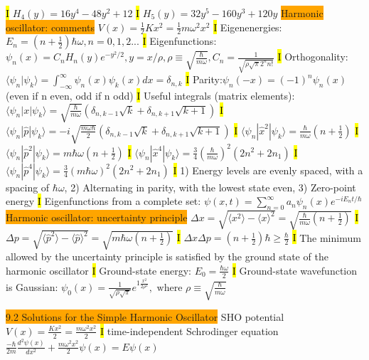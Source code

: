 \documentclass[fontsize=4pt]{scrartcl}
\begin{document}
\hl{I}
$H_4(y) = 16y^4 - 48y^2 + 12$
\hl{I}
$H_5(y) = 32y^5 - 160y^3 + 120y$
\colorbox{Orange}{Harmonic oscillator: comments}
$V(x) = \frac{1}{2}Kx^2 = \frac{1}{2}m\omega^2 x^2$
\hl{I}
Eigenenergies: $E_n = (n+\frac{1}{2})\hbar \omega, n =0,1,2...$
 \hl{I}
Eigenfunctions: $\psi_n(x) = C_n H_n (y) e^{-y^2 / 2}, y = x/\rho , \rho \equiv \sqrt{\frac{\hbar}{m \omega}}, C_n = \frac{1}{\sqrt{\rho \sqrt{\pi}2^n n!}}$
\hl{I}
Orthogonality: $\langle \psi_n | \psi_k \rangle = \int_{-\infty}^{\infty} \psi_n (x) \psi_k (x) dx =\delta_{n,k}$
\hl{I}
Parity:$ \psi_{n}(-x) = (-1)^n \psi_n (x) $ (even if n even, odd if n odd)
\hl{I}
Useful integrals (matrix elements):
$\langle \psi_n | x | \psi_k \rangle = \sqrt{\frac{\hbar}{m\omega}}(\delta_{n,k-1} \sqrt{k}+\delta_{n, k+1}\sqrt{k+1})$
\hl{I}
$\langle \psi_n | \hat{p} | \psi_k \rangle = -i \sqrt{\frac{m \omega \hbar}{2}}(\delta_{n,k-1} \sqrt{k}+\delta_{n, k+1}\sqrt{k+1})$
\hl{I}
$\langle \psi_n | \hat{x}^2 | \psi_k \rangle = \frac{\hbar}{m\omega} (n+\frac{1}{2})$
\hl{I}
$\langle \psi_n | \hat{p}^2 | \psi_k \rangle = m \hbar \omega (n+\frac{1}{2})$
\hl{I}
$\langle \psi_n | \hat{x}^4 | \psi_k \rangle = \frac{3}{4} (\frac{\hbar}{m\omega})^2 (2n^2 + 2n _1)$
\hl{I}
$\langle \psi_n | \hat{p}^4 | \psi_k \rangle = \frac{3}{4} (m\hbar \omega)^2 (2n^2 + 2n _1)$
\hl{I}
1) Energy levels are evenly spaced, with a spacing of $\hbar \omega$, 2) Alternating in parity, with the lowest state even, 3) Zero-point energy
\hl{I}
Eigenfunctions from a complete set: $ \psi(x,t) = \sum_{n=0}^{\infty} a_n \psi_n (x) e^{-i E_n t / \hbar}$
\colorbox{Orange}{Harmonic oscillator: uncertainty principle}
$\Delta x = \sqrt{\langle x^2 \rangle - \langle x \rangle^2} = \sqrt{\frac{\hbar}{m\omega}(n+\frac{1}{2})}$
\hl{I}
$\Delta p = \sqrt{\langle \hat{p}^2 \rangle - \langle \hat{p} \rangle^2} = \sqrt{m\hbar \omega (n+\frac{1}{2})}$
\hl{I}
$\Delta x \Delta p = (n + \frac{1}{2})\hbar \geq \frac{\hbar}{2}$
\hl{I}
The minimum allowed by the uncertainty principle is satisfied by the ground state of the harmonic oscillator
\hl{I}
Ground-state energy: $E_0 = \frac{\hbar \omega}{2}$
\hl{I}
Ground-state wavefunction is Gaussian: $\psi_0(x) = \frac{1}{\sqrt{\rho \sqrt{\pi}}}e^{1\frac{x^2}{2\rho^2}}, \text{ where } \rho \equiv \sqrt{\frac{\hbar}{m\omega}}$


\colorbox{Orange}{9.2 Solutions for the Simple Harmonic Oscillator}
SHO potential $V(x) = \frac{Kx^2}{2}=\frac{m\omega^2 x^2}{2}$
\hl{I}
time-independent Schrodinger equation $\frac{-\hbar}{2m}\frac{d^2 \psi (x)}{dx^2} + \frac{m \omega^2 x^2}{2}\psi(x) = E\psi(x)$  
\end{document}

